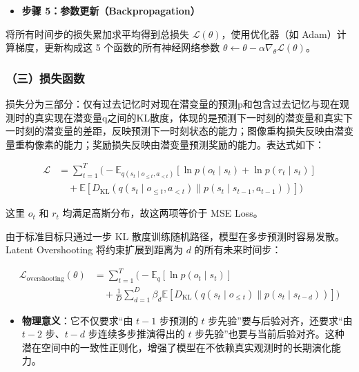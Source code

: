 \begin{itemize}
\tightlist
\item
  \textbf{步骤 5：参数更新（Backpropagation）}
\end{itemize}

将所有时间步的损失累加求平均得到总损失 \(\mathcal{L}(\theta)\)，使用优化器（如 Adam）计算梯度，更新构成这 5 个函数的所有神经网络参数 \(\theta \leftarrow \theta - \alpha \nabla_{\theta}\mathcal{L}(\theta)\)。

\hypertarget{ux4e09ux635fux5931ux51fdux6570-3}{%
\subsubsection{（三）损失函数}\label{ux4e09ux635fux5931ux51fdux6570-3}}

损失分为三部分：仅有过去记忆时对现在潜变量的预测p和包含过去记忆与现在观测时的真实现在潜变量q之间的KL散度，体现的是预测下一时刻的潜变量和真实下一时刻的潜变量的差距，反映预测下一时刻状态的能力；图像重构损失反映由潜变量重构像素的能力；奖励损失反映由潜变量预测奖励的能力。表达式如下：

\[
\begin{aligned}
\mathcal{L}
&=
\sum_{t=1}^{T}
\Biggl(
-\mathbb{E}_{q(s_t \mid o_{\le t}, a_{<t})}
\left[\ln p(o_t \mid s_t) + \ln p(r_t \mid s_t)\right]
\\
&\quad+
\mathbb{E}
\left[
D_{\mathrm{KL}}\left(
q(s_t \mid o_{\le t}, a_{<t})
\parallel
p(s_t \mid s_{t-1}, a_{t-1})
\right)
\right]
\Biggr)
\end{aligned}
\]

这里 \(o_t\) 和 \(r_t\) 均满足高斯分布，故这两项等价于 MSE Loss。

由于标准目标只通过一步 KL 散度训练随机路径，模型在多步预测时容易发散。Latent Overshooting 将约束扩展到距离为 \(d\) 的所有未来时间步：

\[
\begin{aligned}
\mathcal{L}_{\mathrm{overshooting}}(\theta)
&=
\sum_{t=1}^{T}
\Biggl(
-\mathbb{E}_{q}\left[\ln p(o_t \mid s_t)\right]
\\
&\quad+
\frac{1}{D}
\sum_{d=1}^{D}
\beta_d
\mathbb{E}
\left[
D_{\mathrm{KL}}\left(
q(s_t \mid o_{\le t})
\parallel
p(s_t \mid s_{t-d})
\right)
\right]
\Biggr)
\end{aligned}
\]

\begin{itemize}
\tightlist
\item
  \textbf{物理意义}：它不仅要求``由 \(t - 1\) 步预测的 \(t\) 步先验''要与后验对齐，还要求``由 \(t - 2\) 步、\(t - d\) 步连续多步推演得出的 \(t\) 步先验''也要与当前后验对齐。这种潜在空间中的一致性正则化，增强了模型在不依赖真实观测时的长期演化能力。
\end{itemize}

